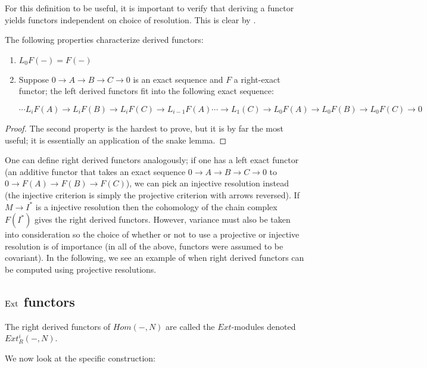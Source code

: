 For this definition to be useful, it is important to verify that
deriving a functor yields functors independent on choice of
resolution. This is clear by \rref{}.

\begin{theorem} The following properties characterize derived
functors: \begin{enumerate}
\item{ $L_0F(-)=F(-)$ }
\item{ Suppose $0\rightarrow A\rightarrow B\rightarrow
C\rightarrow 0$ is an exact sequence and $F$ a right-exact
functor; the left derived functors fit into the following exact
sequence:

\begin{equation} \cdots L_iF(A)\rightarrow L_iF(B)\rightarrow
L_iF(C)\rightarrow L_{i-1}F(A)\cdots\rightarrow
L_1(C)\rightarrow L_0F(A)\rightarrow L_0F(B)\rightarrow
L_0F(C)\rightarrow 0 \end{equation}}
\end{enumerate}
\end{theorem}
\begin{proof} The second property is the hardest to prove, but
it is by far the most useful; it is essentially an application
of the snake lemma. \end{proof}
One can define right derived functors analogously; if one has a
left exact functor (an additive functor that takes an exact
sequence $0\rightarrow A\rightarrow B\rightarrow C\rightarrow 0$ to
$0\rightarrow F(A)\rightarrow F(B)\rightarrow F(C)$), we can
pick an injective resolution instead (the injective criterion is simply the
projective criterion with arrows reversed). If
$M\rightarrow I^*$ is a injective resolution then the cohomology of the chain
complex $F(I^*)$ gives the right derived functors.
However, variance must also be taken into consideration so the
choice of whether or not to use a projective or injective
resolution is of importance (in all of the above, functors were
assumed to be covariant). In the following, we see an example of when right
derived functors can be computed using projective
resolutions.

\subsection{$\operatorname{Ext}$ functors}

\begin{definition} The right derived functors of $Hom(-,N)$ are
called the $Ext$-modules denoted $Ext^i_R(-,N)$.
\end{definition}
We now look at the specific construction:

